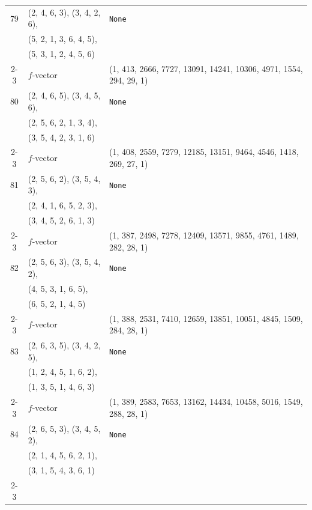 \documentclass[10pt]{amsart}
\numberwithin{equation}{section}
\theoremstyle{plain}
\theoremstyle{definition}
\theoremstyle{remark}
\begin{document}
{\begin{longtable}{c|l|l}
		79 & (2, 4, 6, 3), (3, 4, 2, 6), & \texttt{None} \\
		& (5, 2, 1, 3, 6, 4, 5), &  \\
		& (5, 3, 1, 2, 4, 5, 6) &  \\ \cline{2-3}
		
		& $f$-vector & {(1, 413, 2666, 7727, 13091, 14241, 10306, 4971, 1554, 294, 29, 1)} \\
		\midrule
		
		80 & (2, 4, 6, 5), (3, 4, 5, 6), & \texttt{None} \\
		& (2, 5, 6, 2, 1, 3, 4), &  \\
		& (3, 5, 4, 2, 3, 1, 6) &  \\ \cline{2-3}
		
		& $f$-vector & {(1, 408, 2559, 7279, 12185, 13151, 9464, 4546, 1418, 269, 27, 1)} \\
		\midrule
		
		81 & (2, 5, 6, 2), (3, 5, 4, 3), & \texttt{None} \\
		& (2, 4, 1, 6, 5, 2, 3), &  \\
		& (3, 4, 5, 2, 6, 1, 3) &  \\ \cline{2-3}
		
		& $f$-vector & {(1, 387, 2498, 7278, 12409, 13571, 9855, 4761, 1489, 282, 28, 1)} \\
		\midrule
		
		82 & (2, 5, 6, 3), (3, 5, 4, 2), & \texttt{None} \\
		& (4, 5, 3, 1, 6, 5), &  \\
		& (6, 5, 2, 1, 4, 5) &  \\ \cline{2-3}
		
		& $f$-vector & {(1, 388, 2531, 7410, 12659, 13851, 10051, 4845, 1509, 284, 28, 1)} \\
		\midrule
		
		83 & (2, 6, 3, 5), (3, 4, 2, 5), & \texttt{None} \\
		& (1, 2, 4, 5, 1, 6, 2), &  \\
		& (1, 3, 5, 1, 4, 6, 3) &  \\ \cline{2-3}
		
		& $f$-vector & {(1, 389, 2583, 7653, 13162, 14434, 10458, 5016, 1549, 288, 28, 1)} \\
		\midrule
		
		84 & (2, 6, 5, 3), (3, 4, 5, 2), & \texttt{None} \\
		& (2, 1, 4, 5, 6, 2, 1), &  \\
		& (3, 1, 5, 4, 3, 6, 1) &  \\ \cline{2-3}
		

\end{longtable}}
\end{document}
